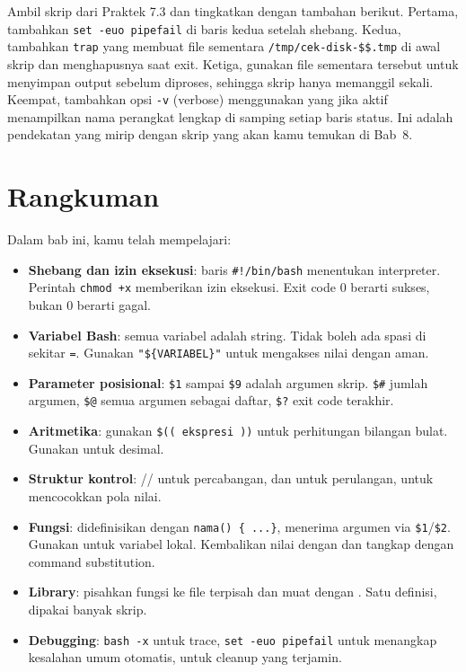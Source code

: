 \begin{challengebox}
Ambil skrip  dari Praktek 7.3 dan tingkatkan dengan
tambahan berikut. Pertama, tambahkan \texttt{set -euo pipefail} di baris
kedua setelah shebang. Kedua, tambahkan \texttt{trap} yang membuat file
sementara \texttt{/tmp/cek-disk-\$\$.tmp} di awal skrip dan menghapusnya
saat exit. Ketiga, gunakan file sementara tersebut untuk menyimpan output
 sebelum diproses, sehingga skrip hanya memanggil  sekali.
Keempat, tambahkan opsi \texttt{-v} (verbose) menggunakan 
yang jika aktif menampilkan nama perangkat lengkap di samping setiap baris
status. Ini adalah pendekatan yang mirip dengan skrip 
yang akan kamu temukan di Bab~8.
\end{challengebox}

\section{Rangkuman}
\label{sec:rangkuman-bash-programming}

Dalam bab ini, kamu telah mempelajari:

\begin{itemize}[noitemsep,topsep=2pt]
    \item \textbf{Shebang dan izin eksekusi}: baris \texttt{\#!/bin/bash}
          menentukan interpreter. Perintah \texttt{chmod +x} memberikan
          izin eksekusi. Exit code 0 berarti sukses, bukan 0 berarti
          gagal.
    \item \textbf{Variabel Bash}: semua variabel adalah string. Tidak
          boleh ada spasi di sekitar \texttt{=}. Gunakan
          \texttt{"\$\{VARIABEL\}"} untuk mengakses nilai dengan aman.
    \item \textbf{Parameter posisional}: \texttt{\$1} sampai \texttt{\$9}
          adalah argumen skrip. \texttt{\$\#} jumlah argumen, \texttt{\$@}
          semua argumen sebagai daftar, \texttt{\$?} exit code terakhir.
    \item \textbf{Aritmetika}: gunakan \texttt{\$(( ekspresi ))} untuk
          perhitungan bilangan bulat. Gunakan  untuk desimal.
    \item \textbf{Struktur kontrol}: // untuk
          percabangan,  dan  untuk perulangan,
           untuk mencocokkan pola nilai.
    \item \textbf{Fungsi}: didefinisikan dengan \texttt{nama() \{ ...\}},
          menerima argumen via \texttt{\$1}/\texttt{\$2}. Gunakan
           untuk variabel lokal. Kembalikan nilai dengan
           dan tangkap dengan command substitution.
    \item \textbf{Library}: pisahkan fungsi ke file terpisah dan muat
          dengan . Satu definisi, dipakai banyak skrip.
    \item \textbf{Debugging}: \texttt{bash -x} untuk trace, \texttt{set
          -euo pipefail} untuk menangkap kesalahan umum otomatis,
           untuk cleanup yang terjamin.
\end{itemize}

